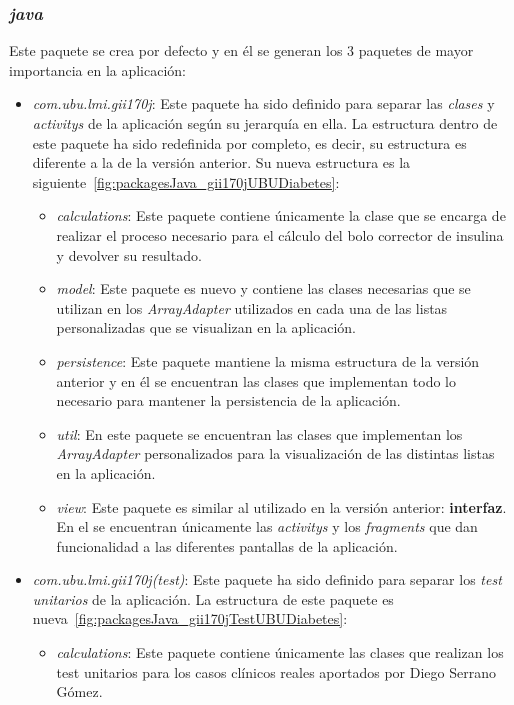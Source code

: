 \subsubsection{\textit{java}}\label{sssec:java}
Este paquete se crea por defecto y en él se generan los 3 paquetes de mayor importancia en la aplicación:
\begin{itemize}
	\item \textit{com.ubu.lmi.gii170j}: Este paquete ha sido definido para separar las \textit{clases} y \textit{activitys} de la aplicación según su jerarquía en ella. La estructura dentro de este paquete ha sido redefinida por completo, es decir, su estructura es diferente a la de la versión anterior. Su nueva estructura es la siguiente~\ref{fig:packagesJava_gii170jUBUDiabetes}:
	\begin{itemize}
		\item \textit{calculations}: Este paquete contiene únicamente la clase que se encarga de realizar el proceso necesario para el cálculo del bolo corrector de insulina y devolver su resultado.
		\item \textit{model}: Este paquete es nuevo y contiene las clases necesarias que se utilizan en los \textit{ArrayAdapter}  utilizados en cada una de las listas personalizadas que se visualizan en la aplicación.
		\item \textit{persistence}: Este paquete mantiene la misma estructura de la versión anterior y en él se encuentran las clases que implementan todo lo necesario para mantener la persistencia de la aplicación. 
		\item \textit{util}: En este paquete se encuentran las clases que implementan los \textit{ArrayAdapter}  personalizados para la visualización de las distintas listas en la aplicación.
		\item \textit{view}: Este paquete es similar al utilizado en la versión anterior: \textbf{interfaz}. En el se encuentran únicamente las \textit{activitys}  y los \textit{fragments} que dan funcionalidad a las diferentes pantallas de la aplicación.
	\end{itemize}
	\item \textit{com.ubu.lmi.gii170j(test)}: Este paquete ha sido definido para separar los \textit{test unitarios} de la aplicación. La estructura de este paquete es nueva~\ref{fig:packagesJava_gii170jTestUBUDiabetes}:
	\begin{itemize}
		\item \textit{calculations}: Este paquete contiene únicamente las clases que realizan los test unitarios para los casos clínicos reales aportados por Diego Serrano Gómez.

\end{itemize}
\end{itemize}
